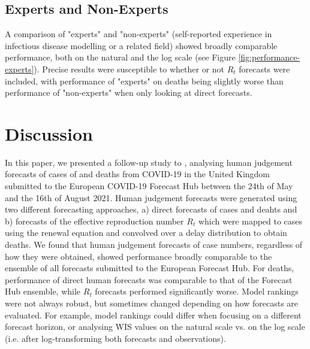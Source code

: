 \documentclass[10pt,a4paper,twocolumn]{article}
\begin{document}

\subsection*{Experts and Non-Experts}

A comparison of "experts" and "non-experts" (self-reported experience in infectious disease modelling or a related field) showed broadly comparable performance, both on the natural and the log scale (see Figure \ref{fig:performance-experts}). Precise results were susceptible to whether or not $R_t$ forecasts were included, with performance of "experts" on deaths being slightly worse than performance of "non-experts" when only looking at direct forecasts. 


\section*{Discussion}


In this paper, we presented a follow-up study to \cite{bosseComparingHumanModelbased2022}, analysing human judgement forecasts of cases of and deaths from COVID-19 in the United Kingdom submitted to the European COVID-19 Forecast Hub between the 24th of May and the 16th of August 2021. Human judgement forecasts were generated using two different forecasting approaches, a) direct forecasts of cases and deahts and b) forecasts of the effective reproduction number $R_t$ which were mapped to cases using the renewal equation and convolved over a delay distribution to obtain deaths. We found that human judgement forecasts of case numbers, regardless of how they were obtained, showed performance broadly comparable to the ensemble of all forecasts submitted to the European Forecast Hub. For deaths, performance of direct human forecasts was comparable to that of the Forecast Hub ensemble, while $R_t$ forecasts performed significantly worse. Model rankings were not always robust, but sometimes changed depending on how forecasts are evaluated. For example, model rankings could differ when focusing on a different forecast horizon, or analysing WIS values on the natural scale vs. on the log scale (i.e. after log-transforming both forecasts and observations). 
\end{document}
